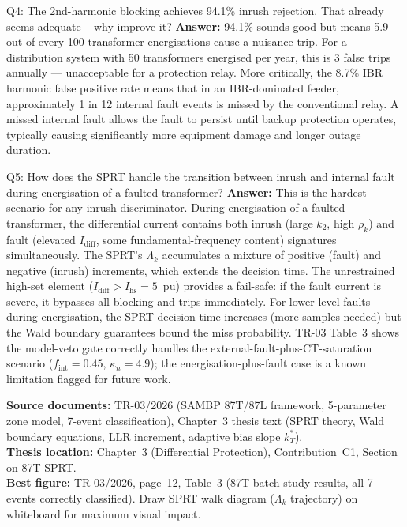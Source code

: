 \documentclass[12pt,a4paper]{article}
\begin{document}
\begin{keybox}{Q4: The 2nd-harmonic blocking achieves 94.1\% inrush rejection. That already seems adequate -- why improve it?}
\textbf{Answer:} 94.1\% sounds good but means 5.9 out of every 100 transformer energisations cause a nuisance trip. For a distribution system with 50 transformers energised per year, this is 3 false trips annually --- unacceptable for a protection relay. More critically, the 8.7\% IBR harmonic false positive rate means that in an IBR-dominated feeder, approximately 1 in 12 internal fault events is missed by the conventional relay. A missed internal fault allows the fault to persist until backup protection operates, typically causing significantly more equipment damage and longer outage duration.
\end{keybox}

\begin{keybox}{Q5: How does the SPRT handle the transition between inrush and internal fault during energisation of a faulted transformer?}
\textbf{Answer:} This is the hardest scenario for any inrush discriminator. During energisation of a faulted transformer, the differential current contains both inrush (large $k_2$, high $\rho_k$) and fault (elevated $I_\mathrm{diff}$, some fundamental-frequency content) signatures simultaneously. The SPRT's $\Lambda_k$ accumulates a mixture of positive (fault) and negative (inrush) increments, which extends the decision time. The unrestrained high-set element ($I_\mathrm{diff} > I_\mathrm{hs} = 5$~pu) provides a fail-safe: if the fault current is severe, it bypasses all blocking and trips immediately. For lower-level faults during energisation, the SPRT decision time increases (more samples needed) but the Wald boundary guarantees bound the miss probability. TR-03 Table~3 shows the model-veto gate correctly handles the external-fault-plus-CT-saturation scenario ($f_\mathrm{int}=0.45$, $\kappa_n=4.9$); the energisation-plus-fault case is a known limitation flagged for future work.
\end{keybox}

\vfill
\begin{tcolorbox}[colback=iitmnavy!8,colframe=iitmnavy,arc=3pt,boxrule=0.8pt]
\small
\textbf{Source documents:} TR-03/2026 (SAMBP 87T/87L framework, 5-parameter zone model, 7-event classification), Chapter~3 thesis text (SPRT theory, Wald boundary equations, LLR increment, adaptive bias slope $k_T^*$). \\
\textbf{Thesis location:} Chapter~3 (Differential Protection), Contribution~C1, Section on 87T-SPRT. \\
\textbf{Best figure:} TR-03/2026, page~12, Table~3 (87T batch study results, all 7 events correctly classified). Draw SPRT walk diagram ($\Lambda_k$ trajectory) on whiteboard for maximum visual impact.
\end{tcolorbox}
\end{document}
